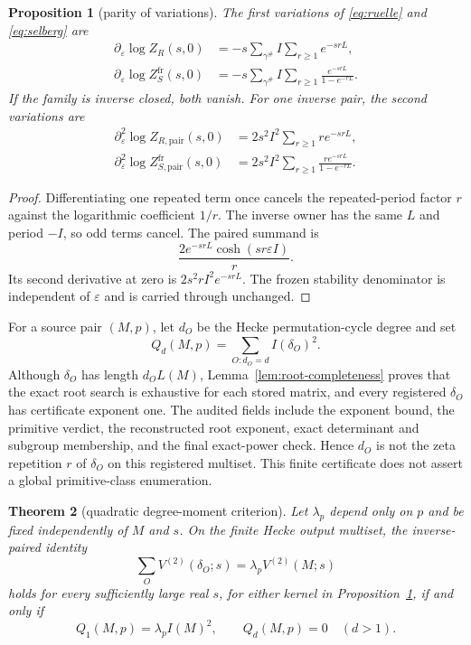 \documentclass[11pt]{article}
\newtheorem{theorem}{Theorem}[section]
\newtheorem{proposition}[theorem]{Proposition}
\theoremstyle{definition}
\theoremstyle{remark}
\newcommand{\e}{\varepsilon}
\begin{document}
\begin{proposition}[parity of variations]\label{prop:variations}
The first variations of \eqref{eq:ruelle} and \eqref{eq:selberg} are
\begin{align*}
\partial_\e\log Z_R(s,0)&=-s\sum_{\gamma^\#}I\sum_{r\geq1}e^{-srL},\\
\partial_\e\log Z_S^{\mathrm{fr}}(s,0)&=-s\sum_{\gamma^\#}I\sum_{r\geq1}\frac{e^{-srL}}{1-e^{-rL}}.
\end{align*}
If the family is inverse closed, both vanish. For one inverse pair, the second variations are
\begin{align*}
\partial_\e^2\log Z_{R,\mathrm{pair}}(s,0)
&=2s^2I^2\sum_{r\geq1}r e^{-srL},\\
\partial_\e^2\log Z_{S,\mathrm{pair}}^{\mathrm{fr}}(s,0)
&=2s^2I^2\sum_{r\geq1}\frac{r e^{-srL}}{1-e^{-rL}}.
\end{align*}
\end{proposition}

\begin{proof}
Differentiating one repeated term once cancels the repeated-period factor $r$ against the logarithmic coefficient $1/r$. The inverse owner has the same $L$ and period $-I$, so odd terms cancel. The paired summand is
\[
\frac{2e^{-srL}\cosh(sr\e I)}r.
\]
Its second derivative at zero is $2s^2rI^2e^{-srL}$. The frozen stability denominator is independent of $\e$ and is carried through unchanged.
\end{proof}

For a source pair $(M,p)$, let $d_O$ be the Hecke permutation-cycle degree and set
\[
Q_d(M,p)=\sum_{O:d_O=d} I(\delta_O)^2.
\]
Although $\delta_O$ has length $d_OL(M)$, Lemma~\ref{lem:root-completeness} proves that the exact root search is exhaustive for each stored matrix, and every registered $\delta_O$ has certificate exponent one. The audited fields include the exponent bound, the primitive verdict, the reconstructed root exponent, exact determinant and subgroup membership, and the final exact-power check. Hence $d_O$ is not the zeta repetition $r$ of $\delta_O$ on this registered multiset. This finite certificate does not assert a global primitive-class enumeration.

\begin{theorem}[quadratic degree-moment criterion]\label{thm:moment}
Let $\lambda_p$ depend only on $p$ and be fixed independently of $M$ and $s$. On the finite Hecke output multiset, the inverse-paired identity
\[
\sum_O V^{(2)}(\delta_O;s)=\lambda_pV^{(2)}(M;s)
\]
holds for every sufficiently large real $s$, for either kernel in Proposition~\ref{prop:variations}, if and only if
\[
Q_1(M,p)=\lambda_p I(M)^2,
\qquad
Q_d(M,p)=0\quad(d>1).
\]
\end{theorem}
\end{document}
